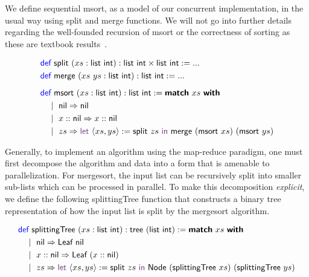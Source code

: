 We define sequential \textsf{msort}, as a model of our concurrent implementation,
in the usual way using \textsf{split} and \textsf{merge} functions.
We will not go into further details regarding the well-founded recursion
of \textsf{msort} or the correctness of sorting as these are textbook results~\cite{cpdt,pierce10}.

\vspace{-1em}
\begingroup
\small
\addtolength{\jot}{-0.2em}
\begin{align*}
  &\Def\ \textsf{split}\ (xs : \textsf{list}\ \textsf{int}) : \textsf{list}\ \textsf{int} \times \textsf{list}\ \textsf{int} := ... \\
  &\Def\ \textsf{merge}\ (xs\ ys : \textsf{list}\ \textsf{int}) : \textsf{list}\ \textsf{int} := ...
  \\[0.5em]
  &\Def\ \textsf{msort}\ (xs : \textsf{list}\ \textsf{int}) : \textsf{list}\ \textsf{int} := \Match\ xs\ \With \\
  &\quad\mid\ \textsf{nil} \Rightarrow \textsf{nil} \\
  &\quad\mid\ x :: \textsf{nil} \Rightarrow x :: \textsf{nil} \\
  &\quad\mid\ zs \Rightarrow \Let\ \langle{xs, ys}\rangle := \textsf{split}\ zs\ \In\ \textsf{merge}\ (\textsf{msort}\ xs)\ (\textsf{msort}\ ys)
\end{align*}
\endgroup

Generally, to implement an algorithm using the map-reduce paradigm, one must first 
decompose the algorithm and data into a form that is amenable to parallelization. 
For mergesort, the input list can be recursively split into smaller sub-lists
which can be processed in parallel. To make this decomposition \emph{explicit},
we define the following \textsf{splittingTree} function that constructs a binary tree
representation of how the input list is split by the mergesort algorithm.

\vspace{-1em}
\begingroup
\small
\addtolength{\jot}{-0.2em}
\begin{align*}
  &\Def\ \textsf{splittingTree}\ (xs : \textsf{list}\ \textsf{int}) : \textsf{tree}\ (\textsf{list}\ \textsf{int}) := \Match\ xs\ \With \\
  &\quad\mid\ \textsf{nil} \Rightarrow \textsf{Leaf}\ \textsf{nil} \\
  &\quad\mid\ x :: \textsf{nil} \Rightarrow \textsf{Leaf}\ (x :: \textsf{nil}) \\
  &\quad\mid\ zs \Rightarrow \Let\ \langle{xs, ys}\rangle := \textsf{split}\ zs\ \In\ \textsf{Node}\ (\textsf{splittingTree}\ xs)\ (\textsf{splittingTree}\ ys)
\end{align*}
\endgroup

